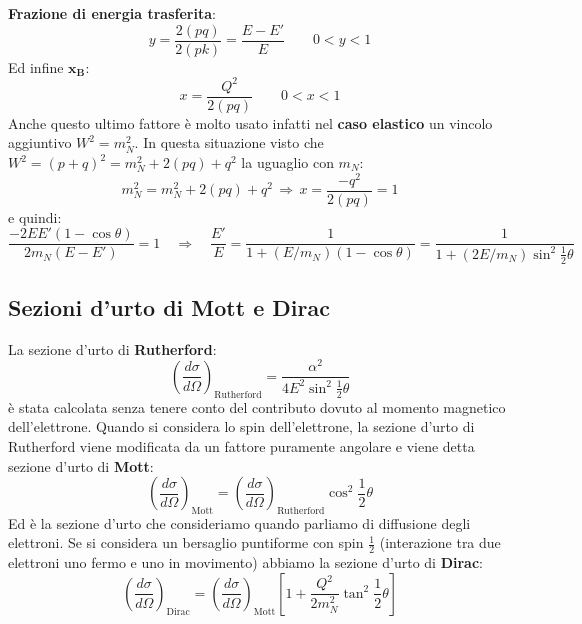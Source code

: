 \textbf{Frazione di energia trasferita}:
\begin{equation*}
    y=\frac{2(pq)}{2(pk)}=\frac{E-E'}{E} \qquad 0<y<1
\end{equation*}
Ed infine $\mathbf{x_B}$:
\begin{equation*}
    x=\frac{Q^2}{2(pq)} \qquad 0<x<1
\end{equation*}
Anche questo ultimo fattore è molto usato infatti nel \textbf{caso elastico} un vincolo aggiuntivo $W^2=m_N^2$. In questa situazione visto che $W^2=(p+q)^2=m_N^2+2(pq)+q^2$ la uguaglio con $m_N$:
\begin{equation*}
    m_N^2=m_N^2+2(pq)+q^2 \,\Rightarrow\,x=\frac{-q^2}{2(pq)}=1
\end{equation*}
e quindi:
\begin{equation*}
    \frac{-2EE'(1-\cos{\theta})}{2m_N(E-E')}=1 \quad \Rightarrow\quad\frac{E'}{E}=\frac{1}{1+(E/m_N)(1-\cos{\theta})}=\frac{1}{1+(2E/m_N)\sin^2{\frac{1}{2}\theta}}
\end{equation*}
\subsection{Sezioni d'urto di Mott e Dirac}
La sezione d'urto di\textbf{ Rutherford}:
\begin{equation*}
    \left(\frac{d\sigma}{d\Omega}\right)_\text{Rutherford}=\frac{\alpha^2}{4E^2\sin^2{\frac{1}{2}\theta}}
\end{equation*}
è stata calcolata senza tenere conto del contributo dovuto al momento magnetico dell'elettrone. Quando si considera lo spin dell'elettrone, la sezione d'urto di Rutherford viene modificata da un fattore puramente angolare e viene detta sezione d'urto di \textbf{Mott}:
\begin{equation*}
    \left(\frac{d\sigma}{d\Omega}\right)_\text{Mott}=\left(\frac{d\sigma}{d\Omega}\right)_\text{Rutherford}\cos^2{\frac{1}{2}\theta}
\end{equation*}
Ed è la sezione d'urto che consideriamo quando parliamo di diffusione degli elettroni. Se si considera un bersaglio puntiforme con spin $\frac{1}{2}$ (interazione tra due elettroni uno fermo e uno in movimento) abbiamo la sezione d'urto di \textbf{Dirac}:
\begin{equation*}
    \left(\frac{d\sigma}{d\Omega}\right)_\text{Dirac}=\left(\frac{d\sigma}{d\Omega}\right)_\text{Mott}\left[1+\frac{Q^2}{2m_N^2}\tan^2{\frac{1}{2}\theta}\right]
\end{equation*}

